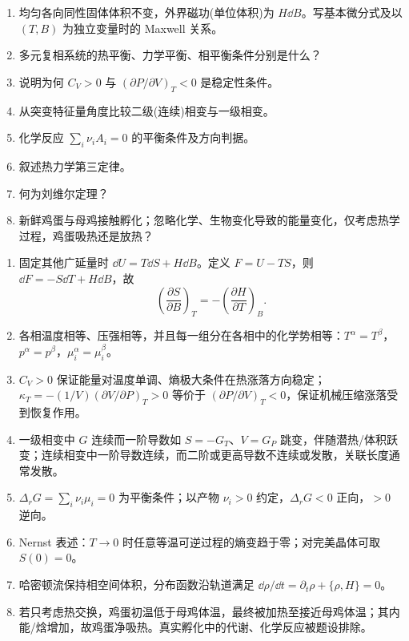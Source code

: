 
\begin{question}[40 分]
\begin{enumerate}
\item 均匀各向同性固体体积不变，外界磁功(单位体积)为 $H\dd{B}$。写基本微分式及以 $(T,B)$ 为独立变量时的 Maxwell 关系。
\item 多元复相系统的热平衡、力学平衡、相平衡条件分别是什么？
\item 说明为何 $C_V>0$ 与 $(\partial P/\partial V)_T<0$ 是稳定性条件。
\item 从突变特征量角度比较二级(连续)相变与一级相变。
\item 化学反应 $\sum_i\nu_iA_i=0$ 的平衡条件及方向判据。
\item 叙述热力学第三定律。
\item 何为刘维尔定理？
\item 新鲜鸡蛋与母鸡接触孵化；忽略化学、生物变化导致的能量变化，仅考虑热学过程，鸡蛋吸热还是放热？
\end{enumerate}
\begin{solution}
\begin{enumerate}
\item 固定其他广延量时 $\dd{U}=T\dd{S}+H\dd{B}$。定义 $F=U-TS$，则 $\dd{F}=-S\dd{T}+H\dd{B}$，故
\[\boxed{\left(\frac{\partial S}{\partial B}\right)_T=-\left(\frac{\partial H}{\partial T}\right)_B}.\]
\item 各相温度相等、压强相等，并且每一组分在各相中的化学势相等：$T^\alpha=T^\beta$，$p^\alpha=p^\beta$，$\mu_i^\alpha=\mu_i^\beta$。
\item $C_V>0$ 保证能量对温度单调、熵极大条件在热涨落方向稳定；$\kappa_T=-(1/V)(\partial V/\partial P)_T>0$ 等价于 $(\partial P/\partial V)_T<0$，保证机械压缩涨落受到恢复作用。
\item 一级相变中 $G$ 连续而一阶导数如 $S=-G_T$、$V=G_P$ 跳变，伴随潜热/体积跃变；连续相变中一阶导数连续，而二阶或更高导数不连续或发散，关联长度通常发散。
\item $\Delta_rG=\sum_i\nu_i\mu_i=0$ 为平衡条件；以产物 $\nu_i>0$ 约定，$\Delta_rG<0$ 正向，$>0$ 逆向。
\item Nernst 表述：$T\to0$ 时任意等温可逆过程的熵变趋于零；对完美晶体可取 $S(0)=0$。
\item 哈密顿流保持相空间体积，分布函数沿轨道满足 $\dd{\rho}/\dd{t}=\partial_t\rho+\{\rho,H\}=0$。
\item 若只考虑热交换，鸡蛋初温低于母鸡体温，最终被加热至接近母鸡体温；其内能/焓增加，故鸡蛋净吸热。真实孵化中的代谢、化学反应被题设排除。
\end{enumerate}
\end{solution}
\end{question}

